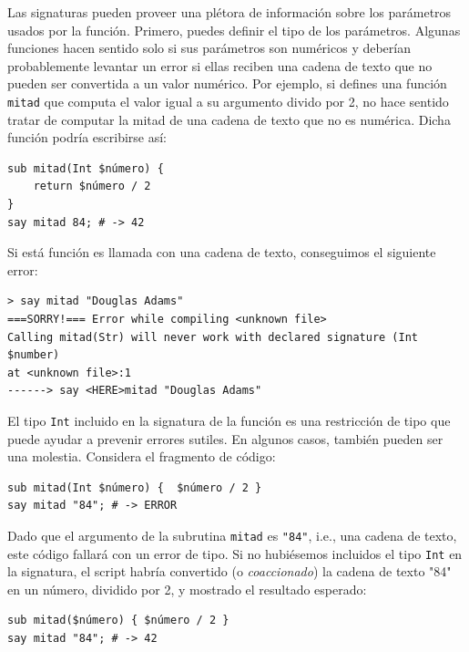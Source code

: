 Las signaturas pueden proveer una plétora de información
sobre los parámetros usados por la función. Primero, puedes
definir el tipo de los parámetros. Algunas funciones hacen 
sentido solo si sus parámetros son numéricos y deberían
probablemente levantar un error si ellas reciben una
cadena de texto que no pueden ser convertida a un valor
numérico. Por ejemplo, si defines una función {\tt mitad}
que computa el valor igual a su argumento divido por 2,
no hace sentido tratar de computar la mitad de una
cadena de texto que no es numérica. Dicha función
podría escribirse así:

\begin{verbatim}
sub mitad(Int $número) { 
    return $número / 2 
}
say mitad 84; # -> 42
\end{verbatim}

Si está función es llamada con una cadena de texto,
conseguimos el siguiente error:

\begin{verbatim}
> say mitad "Douglas Adams"
===SORRY!=== Error while compiling <unknown file>
Calling mitad(Str) will never work with declared signature (Int $number)
at <unknown file>:1
------> say <HERE>mitad "Douglas Adams"
\end{verbatim}

El tipo {\tt Int} incluido en la signatura de la función es
una restricción de tipo que puede ayudar a prevenir errores
sutiles. En algunos casos, también pueden ser una molestia.
Considera el fragmento de código:


\begin{verbatim}
sub mitad(Int $número) {  $número / 2 }
say mitad "84"; # -> ERROR
\end{verbatim}

Dado que el argumento de la subrutina {\tt mitad} es {\tt "84"},
i.e., una cadena de texto, este código fallará con un error de 
tipo. Si no hubiésemos incluidos el tipo {\tt Int} en la signatura,
el script habría convertido (o \emph{coaccionado}) la cadena de
texto "84" en un número, dividido por 2, y mostrado el
resultado esperado:

\begin{verbatim}
sub mitad($número) { $número / 2 }
say mitad "84"; # -> 42
\end{verbatim}

